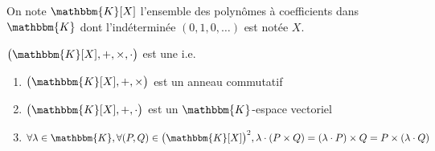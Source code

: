 \begin{rmk}
	[Notation]
	On note $\mathbbm{K}[X]$ l'ensemble des polynômes à coefficients dans $\mathbbm{K}$ dont l'indéterminée $(0, 1, 0, \ldots)$ est notée $X$.
\end{rmk}

\begin{prop}
	$\big(\mathbbm{K}[X],+,\times,\cdot\big)$ est une  i.e.
	\begin{enumerate}
		\item $\big(\mathbbm{K}[X], +, \times\big)$ est un anneau commutatif
		\item $\big(\mathbbm{K}[X], +, \cdot\big)$ est un $\mathbbm{K}$-espace vectoriel
		\item $\forall \lambda \in \mathbbm{K}, \forall (P,Q) \in \big(\mathbbm{K}[X]\big)^2, \lambda \cdot (P \times Q) = (\lambda \cdot P) \times Q = P \times (\lambda \cdot Q)$
	\end{enumerate}
\end{prop}


